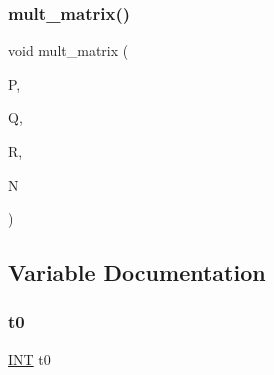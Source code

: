 \subsubsection{\texorpdfstring{mult\+\_\+matrix()}{mult\_matrix()}}
{\footnotesize\ttfamily void mult\+\_\+matrix (\begin{DoxyParamCaption}\item[{\mbox{\hyperlink{galois_8h_a09fddde158a3a20bd2dcadb609de11dc}{I\+NT}} $\ast$}]{P,  }\item[{\mbox{\hyperlink{galois_8h_a09fddde158a3a20bd2dcadb609de11dc}{I\+NT}} $\ast$}]{Q,  }\item[{\mbox{\hyperlink{galois_8h_a09fddde158a3a20bd2dcadb609de11dc}{I\+NT}} $\ast$}]{R,  }\item[{\mbox{\hyperlink{galois_8h_a09fddde158a3a20bd2dcadb609de11dc}{I\+NT}}}]{N }\end{DoxyParamCaption})}



\subsection{Variable Documentation}
\mbox{\label{cayley__sym__n_8_c_a4268f4fe222ffb119218a0199f5e1904}} 
\subsubsection{\texorpdfstring{t0}{t0}}
{\footnotesize\ttfamily \mbox{\hyperlink{galois_8h_a09fddde158a3a20bd2dcadb609de11dc}{I\+NT}} t0}


